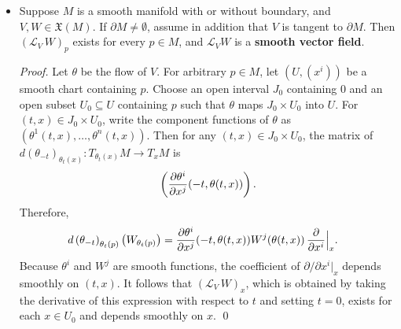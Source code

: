 \documentclass[11pt]{article}
\begin{document}
\begin{itemize}
\item \begin{lemma}
Suppose $M$ is a smooth manifold with or without boundary, and $V, W \in \mathfrak{X}(M)$. If $\partial M \neq \emptyset$, assume in addition that $V$ is tangent to $\partial M$. Then $(\mathscr{L}_{V}\,W)_{p}$ exists for every $p \in M$, and $\mathscr{L}_{V} W$ is a \textbf{smooth vector field}.
\end{lemma}
\begin{proof}
Let $\theta$ be the flow of $V$. For arbitrary $p\in M$, let $(U, (x^i))$ be a smooth chart containing $p$. Choose an open interval $J_0$ containing $0$ and an open subset $U_0 \subseteq U$ containing $p$ such that $\theta$ maps $J_0 \times U_0$ into $U$. For $(t, x) \in J_0 \times U_0$, write the component functions of $\theta$ as $(\theta^1(t, x), \ldots, \theta^{n}(t, x))$. Then for any $(t, x)\in J_0 \times U_0$, the matrix of $d(\theta_{-t})_{\theta_t(x)}: T_{\theta_t(x)}M \rightarrow T_{x}M$ is
\begin{align*}
\left(\frac{\partial \theta^{i}}{ \partial x^{j}}(-t,  \theta(t, x))\right).
\end{align*}
Therefore,
\begin{align*}
d\left(\theta_{-t}\right)_{\theta_{t}(p)}\left(W_{\theta_t(p)}\right) &= \frac{\partial \theta^{i}}{ \partial x^{j}}(-t,  \theta(t, x)) W^{j}(\theta(t, x))\,\frac{\partial }{ \partial x^{i}}\Bigr|_{x}.
\end{align*}
Because $\theta^i$ and $W^j$ are smooth functions, the coefficient of $\partial / \partial x^i |_{x}$ depends smoothly on $(t, x)$. It follows that $(\mathscr{L}_{V}\,W)_{x}$, which is obtained by taking the derivative of this expression with respect to $t$ and setting $t = 0$, exists for each $x \in U_0$ and depends smoothly on $x$.  \qed
\end{proof}


\end{itemize}
\end{document}
